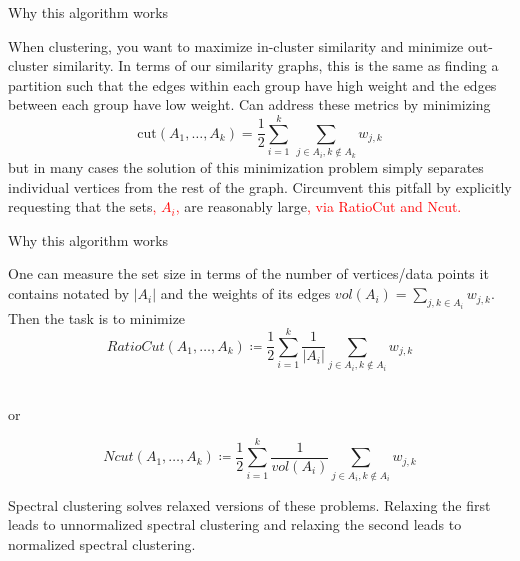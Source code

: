 \documentclass{beamer}
\begin{document}
\begin{frame}{Why this algorithm works}
    \begin{outline}
        \1 When clustering, you want to maximize in-cluster similarity and minimize out-cluster similarity. In terms of our similarity graphs, this is the same as finding a partition such that the edges within each group have high weight and the edges between each group have low weight.
        \1 Can address these metrics by minimizing 
        $$
        \textrm{cut}(A_1, \dots, A_k) = \frac{1}{2} \sum_{i=1}^k \, \sum_{j \in A_i, k \not \in A_k} w_{j, k}
        $$
        but in many cases the solution of this minimization problem simply separates individual vertices from the rest of the graph.
        \1 Circumvent this pitfall by explicitly requesting that the sets\textcolor{red}{, $A_i$, } are reasonably large\textcolor{red}{, via RatioCut and Ncut.}
    \end{outline}
\end{frame}

\begin{frame}{Why this algorithm works}
    \begin{outline}
    \1 One can measure the set size in terms of the number of vertices/data points it contains notated by $|A_i|$ and the weights of its edges $vol(A_i) = \sum_{j, k \in A_i} w_{j, k}$. 
    \1 Then the task is to minimize \vspace{0.1 cm}
    \begin{equation}
    RatioCut(A_1, \dots, A_k) \coloneqq \frac{1}{2}\sum_{i=1}^k \frac{1}{|A_i|}  \sum_{j \in A_i, k \not \in A_i} w_{j, k}
    \end{equation}\\ %
    \begin{centering}
        or
    \end{centering}
    $$
     Ncut(A_1, \dots, A_k) \coloneqq \frac{1}{2}\sum_{i=1}^k \frac{1}{vol(A_i)}  \sum_{j \in A_i, k \not \in A_i} w_{j, k}
    $$
    \end{outline}
    Spectral clustering solves relaxed versions of these problems. Relaxing the first leads to unnormalized spectral clustering and relaxing the second leads to normalized spectral clustering.
\end{frame}
\end{document}
